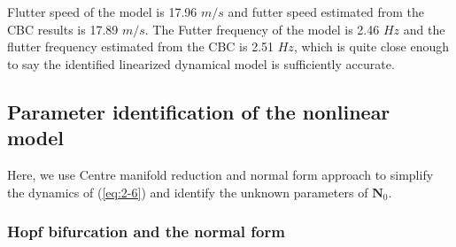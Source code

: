 \documentclass[openacc]{rsproca_new}%
\theoremstyle{own}
\def\vec#1{\ensuremath{\mathbf{#1}}}
\newcommand{\Eref}[1]{(\ref{#1})}
\begin{document}
Flutter speed of the model is 17.96 $m/s$ and futter speed estimated from the CBC results is 17.89 $m/s$. The Futter frequency of the model is 2.46 $Hz$ and the flutter frequency estimated from the CBC is 2.51 $Hz$, which is quite close enough to say the identified linearized dynamical model is sufficiently accurate.

\subsection{Parameter identification of the nonlinear model}
Here, we use Centre manifold reduction and normal form approach to simplify the dynamics of \Eref{eq:2-6} and identify the unknown parameters of $\vec N_0$.

\subsubsection{Hopf bifurcation and the normal form}\label{SNF}
\end{document}
